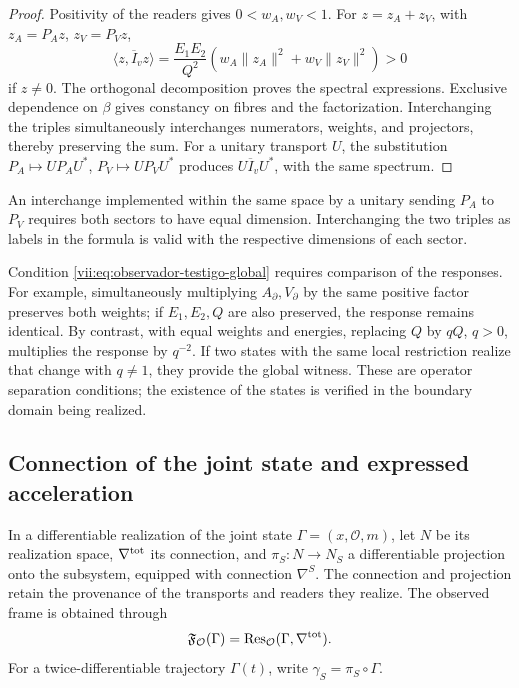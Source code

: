 \begin{proof}
Positivity of the readers gives \(0<w_A,w_V<1\). For
\(z=z_A+z_V\), with \(z_A=P_Az\), \(z_V=P_Vz\),
\[
 \langle z,\overline I_vz\rangle
 =\frac{E_1E_2}{Q^2}
   (w_A\|z_A\|^2+w_V\|z_V\|^2)>0
\]
if \(z\neq0\). The orthogonal decomposition proves the spectral
expressions. Exclusive dependence on \(\beta\) gives constancy
on fibres and the factorization. Interchanging the triples
simultaneously interchanges numerators, weights, and projectors, thereby
preserving the sum. For a unitary transport \(U\), the substitution
\(P_A\mapsto UP_AU^*\), \(P_V\mapsto UP_VU^*\) produces
\(U\overline I_vU^*\), with the same spectrum.
\end{proof}

An interchange implemented within the same space by a unitary
sending \(P_A\) to \(P_V\) requires both sectors to have
equal dimension. Interchanging the two triples as labels in the
formula is valid with the respective dimensions of each sector.

Condition \eqref{vii:eq:observador-testigo-global} requires comparison of
the responses. For example, simultaneously multiplying
\(A_\partial,V_\partial\) by the same positive factor preserves
both weights; if \(E_1,E_2,Q\) are also preserved, the response
remains identical. By contrast, with equal weights and energies, replacing
\(Q\) by \(qQ\), \(q>0\), multiplies the response by \(q^{-2}\).
If two states with the same local restriction realize that change with
\(q\neq1\), they provide the global witness. These are operator
separation conditions; the existence of the states is verified
in the boundary domain being realized.

\subsection{Connection of the joint state and expressed acceleration}
\label{vii:sec:observador-autoinercia}

In a differentiable realization of the joint state
\(\Gamma=(x,\mathcal O,m)\), let \(N\) be its realization space,
\(\nabla^{\rm tot}\) its connection, and \(\pi_S:N\to N_S\) a
differentiable projection onto the subsystem, equipped with connection
\(\nabla^S\). The connection and projection retain the provenance
of the transports and readers they realize. The observed frame is
obtained through
\[
 \mathfrak F_{\mathcal O}(\Gamma)
 =\operatorname{Res}_{\mathcal O}(\Gamma,\nabla^{\rm tot}).
\]
For a twice-differentiable trajectory \(\Gamma(t)\),
write \(\gamma_S=\pi_S\circ\Gamma\).

